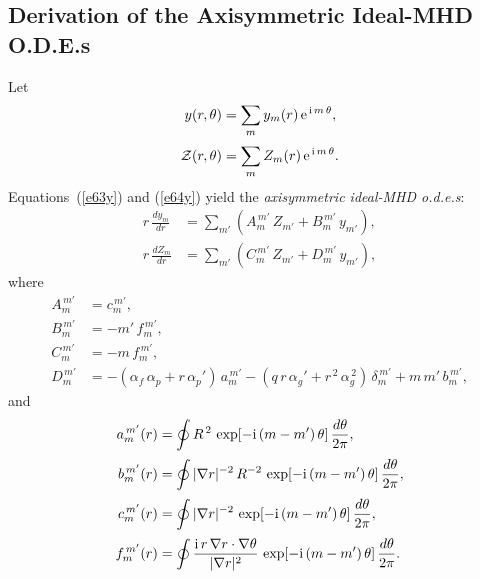 \documentclass[12pt,prb,aps,notitlepage]{revtex4-1}
\begin{document}
\subsection{Derivation of the Axisymmetric Ideal-MHD O.D.E.s}
Let
\begin{align}
y(r,\theta)&= \sum_m y_m(r)\,{\rm e}^{\,{\rm i}\,m\,\theta},\\[0.5ex]
{\cal Z}(r,\theta) &= \sum_m Z_m(r)\,{\rm e}^{\,{\rm i}\,m\,\theta}.
\end{align}
Equations~(\ref{e63y}) and (\ref{e64y}) yield the {\em axisymmetric ideal-MHD o.d.e.s}:
\begin{align}\label{e69u}
r\,\frac{dy_m}{dr}&= \sum_{m'}\left(A_{m}^{\,m'}\,Z_{m'} + B_{m}^{\,m'}\,y_{m'}\right),\\[0.5ex]
r\,\frac{dZ_m}{dr}&= \sum_{m'}\left(C_{m}^{\,m'}\,Z_{m'} + D_{m}^{\,m'}\,y_{m'}\right),\label{e70uu}
\end{align}
where
\begin{align}
A_m^{\,m'} &= c_{m}^{\,m'},\\[0.5ex]
B_m^{\,m'} &= - m'\,f_m^{\,m'},\\[0.5ex]
C_{m}^{\,m'} &= -m\,f_m^{\,m'},\\[0.5ex]
D_{m}^{\,m'}&= -(\alpha_f\,\alpha_p+ r\,\alpha_p')\,a_m^{\,m'} - (q\,r\,\alpha_g' +r^{\,2}\,\alpha_g^{\,2})\,\delta_m^{\,m'}+m\,m'\,b_m^{\,m'},\label{Ddef}
\end{align}
and
\begin{align}\label{e73er}
a_m^{\,m'}(r)  &=\oint R^{\,2}\,\exp[-{\rm i}\,(m-m')\,\theta]\,\frac{d\theta}{2\pi},\\[0.5ex]
b_m^{\,m'}(r)  &=\oint|\nabla r|^{-2}\, R^{-2}\,\exp[-{\rm i}\,(m-m')\,\theta]\,\frac{d\theta}{2\pi},\\[0.5ex]
c_m^{\,m'}(r)  &=\oint|\nabla r|^{-2}\,\exp[-{\rm i}\,(m-m')\,\theta]\,\frac{d\theta}{2\pi},\\[0.5ex]
f_{m}^{\,m'}(r)&= \oint \frac{{\rm i}\,r\,\nabla r\cdot\nabla\theta}{|\nabla r|^2}\,\exp[-{\rm i}\,(m-m')\,\theta]\,\frac{d\theta}{2\pi}.\label{e76er}
\end{align}
\end{document}
